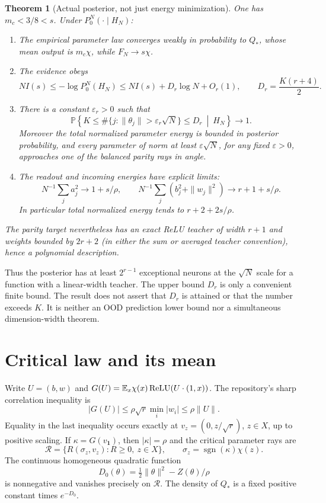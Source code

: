\documentclass[11pt]{article}
\newtheorem{theorem}{Theorem}\newtheorem{lemma}[theorem]{Lemma}
\newcommand{\E}{\mathbb E}\newcommand{\Pp}{\mathbb P}
\newcommand{\one}{\mathbf1}
\begin{document}
\begin{theorem}[Actual posterior, not just energy minimization]
One has $m_c<3/8<s$. Under $P_0^N(\cdot\mid H_N)$:
\begin{enumerate}
\item The empirical parameter law converges weakly in probability to
      $Q_*$, whose mean output is $m_c\chi$, while $F_N\to s\chi$.
\item The evidence obeys
\[
 NI(s)\le-\log P_0^N(H_N)\le NI(s)+D_r\log N+O_r(1),
 \qquad D_r=\frac{K(r+4)}2.                                \tag{1}
\]
\item There is a constant $\varepsilon_r>0$ such that
\[
 \Pp\left\{
 K\le\#\{j:\|\theta_j\|>\varepsilon_r\sqrt N\}\le D_r
       \ \middle|\ H_N\right\}\longrightarrow1.            \tag{2}
\]
      Moreover the total normalized parameter energy is bounded in
      posterior probability, and every parameter of norm at least
      $\varepsilon\sqrt N$, for any fixed $\varepsilon>0$, approaches
      one of the balanced parity rays in angle.
\item The readout and incoming energies have explicit limits:
\[
 N^{-1}\sum_j a_j^2\longrightarrow1+s/\rho,\qquad
 N^{-1}\sum_j(b_j^2+\|w_j\|^2)\longrightarrow r+1+s/\rho.
                                                               \tag{3}
\]
      In particular total normalized energy tends to $r+2+2s/\rho$.
\end{enumerate}
The parity target nevertheless has an exact ReLU teacher of width
$r+1$ and weights bounded by $2r+2$ (in either the sum or averaged
teacher convention), hence a polynomial description.
\end{theorem}

Thus the posterior has at least $2^{r-1}$ exceptional neurons at the
$\sqrt N$ scale for a function with a linear-width teacher. The upper
bound $D_r$ is only a convenient finite bound. The result does not
assert that $D_r$ is attained or that the number exceeds $K$.
It is neither an OOD prediction lower bound nor a simultaneous
dimension-width theorem.

\section{Critical law and its mean}
Write $U=(b,w)$ and $G(U)=\E_x\chi(x)\relu(U\cdot(1,x))$.
The repository's sharp correlation inequality is
\[
 |G(U)|\le\rho\sqrt r\min_i|w_i|\le\rho\|U\|.
\]
Equality in the last inequality occurs exactly at
$v_z=(0,z/\sqrt r)$, $z\in X$, up to positive scaling.
If $\kappa=G(v_{\one})$, then $|\kappa|=\rho$ and the critical
parameter rays are
\[
 \mathcal R=\{R(\sigma_z,v_z):R\ge0,\ z\in X\},\qquad
 \sigma_z=\operatorname{sgn}(\kappa)\chi(z).
\]
The continuous homogeneous quadratic function
\[
 D_0(\theta)=\tfrac12\|\theta\|^2-Z(\theta)/\rho
\]
is nonnegative and vanishes precisely on $\mathcal R$.
The density of $Q_*$ is a fixed positive constant times $e^{-D_0}$.
\end{document}
